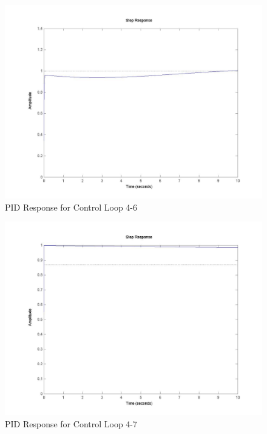 	\begin{figure}[H]
		\includegraphics[width=\textwidth]{part4-6.jpg}
		\caption{PID Response for Control Loop 4-6}
	\end{figure}
	
	\begin{figure}[H]
		\includegraphics[width=\textwidth]{part4-7.jpg}
		\caption{PID Response for Control Loop 4-7}
	\end{figure}
